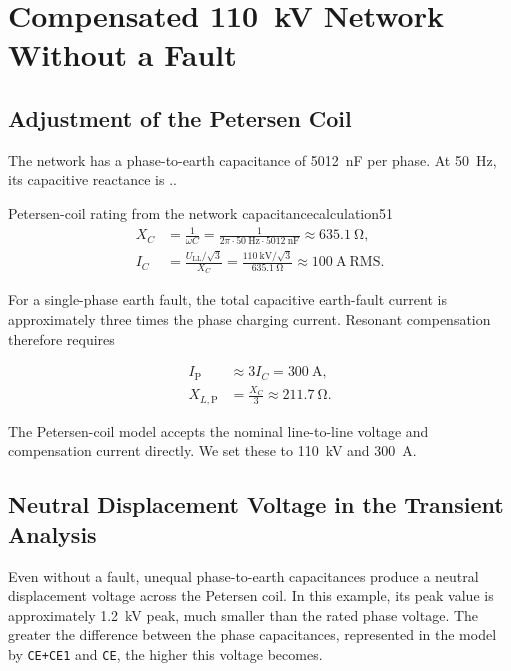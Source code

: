 \section{Compensated \SI{110}{\kilo\volt} Network Without a Fault}
\label{sec:Compensated Network Without a Fault}

\subsection{Adjustment of the Petersen Coil}
\label{sec:Adjustment of the Petersen Coil}

The network has a phase-to-earth capacitance of \SI{5012}{\nano\farad} per phase. At \SI{50}{\hertz}, its capacitive reactance is ..

\begin{calculation}{Petersen-coil rating from the network capacitance}{calculation51}
\begin{align}
X_C&=\frac{1}{\omega C}
 =\frac{1}{2\pi\cdot\SI{50}{\hertz}\cdot\SI{5012}{\nano\farad}}
 \approx\SI{635.1}{\ohm},\\
I_C&=\frac{U_{\mathrm{LL}}/\sqrt{3}}{X_C}
 =\frac{\SI{110}{\kilo\volt}/\sqrt{3}}{\SI{635.1}{\ohm}}
 \approx\SI{100}{\ampere}\ \text{RMS}.
\end{align}

For a single-phase earth fault, the total capacitive earth-fault current is
approximately three times the phase charging current. Resonant compensation
therefore requires

\begin{align}
I_{\mathrm P}&\approx3I_C=\SI{300}{\ampere},\\
X_{L,\mathrm P}&=\frac{X_C}{3}
 \approx\boxed{\SI{211.7}{\ohm}}.
\end{align}
\end{calculation}

The Petersen-coil model accepts the nominal line-to-line voltage and
compensation current directly. We set these to \SI{110}{\kilo\volt} and
\SI{300}{\ampere}.

\subsection{Neutral Displacement Voltage in the Transient Analysis}
\label{sec:Neutral Displacement Voltage in the Transient Analysis}

Even without a fault, unequal phase-to-earth capacitances produce a neutral
displacement voltage across the Petersen coil. In this example, its peak value is
approximately \SI{1.2}{\kilo\volt} peak, much smaller than the rated phase voltage.
The greater the difference between the phase capacitances, represented in the
model by \texttt{CE+CE1} and \texttt{CE}, the higher this voltage becomes.

